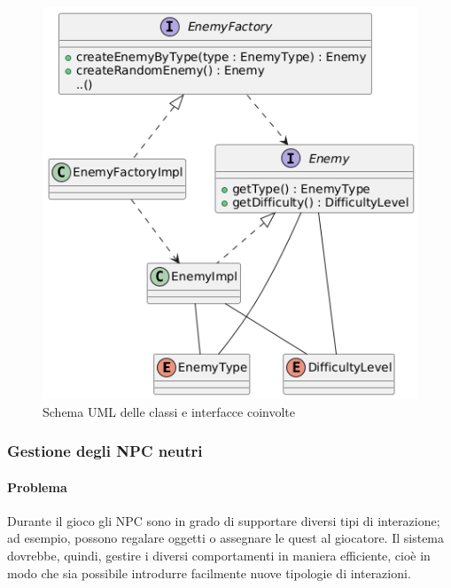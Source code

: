 \documentclass[a4paper,12pt]{report}
\begin{document}
\begin{figure}[H]
	\centering
	\includegraphics[width=\textwidth]{img/EnemyUML.png}
	\caption{Schema UML delle classi e interfacce coinvolte}
	\label{img:EnemyUML}
\end{figure}


\subsubsection{Gestione degli NPC neutri}
\paragraph{Problema} Durante il gioco gli NPC sono in grado di supportare diversi tipi di interazione; ad esempio, possono regalare oggetti o assegnare le quest al giocatore.
Il sistema dovrebbe, quindi, gestire i diversi comportamenti in maniera efficiente, cioè in modo che sia possibile introdurre facilmente nuove tipologie di interazioni.
\end{document}
